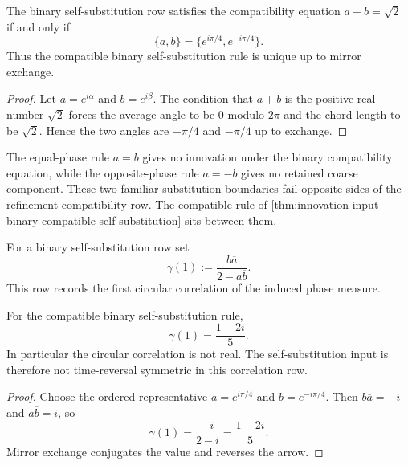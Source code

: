 \begin{theorem}
\label{thm:innovation-input-binary-compatible-self-substitution}
The binary self-substitution row satisfies the compatibility equation
$a+b=\sqrt2$ if and only if
$$
\{a,b\}
=
\{e^{i\pi/4},e^{-i\pi/4}\}.
$$
Thus the compatible binary self-substitution rule is unique up to mirror
exchange.
\end{theorem}

\begin{proof}
Let $a=e^{i\alpha}$ and $b=e^{i\beta}$. The condition that $a+b$ is the
positive real number $\sqrt2$ forces the average angle to be $0$ modulo
$2\pi$ and the chord length to be $\sqrt2$. Hence the two angles are
$+\pi/4$ and $-\pi/4$ up to exchange.
\end{proof}

\begin{principle}
\label{prin:innovation-input-self-substitution-boundary-cases}
The equal-phase rule $a=b$ gives no innovation under the binary
compatibility equation, while the opposite-phase rule $a=-b$ gives no
retained coarse component. These two familiar substitution boundaries fail
opposite sides of the refinement compatibility row. The compatible rule of
\autoref{thm:innovation-input-binary-compatible-self-substitution} sits
between them.
\end{principle}

\begin{definition}
\label{def:innovation-input-one-step-circular-correlation}
For a binary self-substitution row set
$$
\gamma(1)
:=
\frac{b\overline a}{2-a\overline b}.
$$
This row records the first circular correlation of the induced phase
measure.
\end{definition}

\begin{theorem}
\label{thm:innovation-input-self-substitution-time-arrow}
For the compatible binary self-substitution rule,
$$
\gamma(1)=\frac{1-2i}{5}.
$$
In particular the circular correlation is not real. The self-substitution
input is therefore not time-reversal symmetric in this correlation row.
\end{theorem}

\begin{proof}
Choose the ordered representative $a=e^{i\pi/4}$ and
$b=e^{-i\pi/4}$. Then $b\overline a=-i$ and $a\overline b=i$, so
$$
\gamma(1)
=
\frac{-i}{2-i}
=
\frac{1-2i}{5}.
$$
Mirror exchange conjugates the value and reverses the arrow.
\end{proof}

